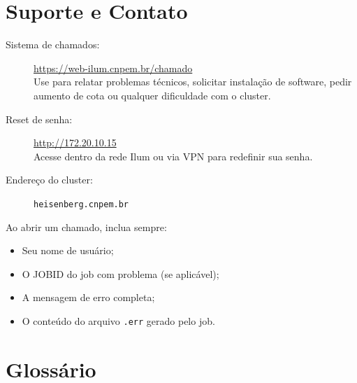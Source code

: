 \documentclass[11pt, a4paper]{article}
\begin{document}
\section{Suporte e Contato}

\begin{tcolorbox}[colback=infoblue, colframe=infoborder,
                  title={Onde buscar ajuda}, fonttitle=\bfseries]
\begin{description}
  \item[Sistema de chamados:] \url{https://web-ilum.cnpem.br/chamado}\\
    Use para relatar problemas técnicos, solicitar instalação de software,
    pedir aumento de cota ou qualquer dificuldade com o cluster.
  \item[Reset de senha:] \url{http://172.20.10.15}\\
    Acesse dentro da rede Ilum ou via VPN para redefinir sua senha.
  \item[Endereço do cluster:] \texttt{heisenberg.cnpem.br}
\end{description}
\end{tcolorbox}

\vspace{1em}

Ao abrir um chamado, inclua sempre:
\begin{itemize}
  \item Seu nome de usuário;
  \item O JOBID do job com problema (se aplicável);
  \item A mensagem de erro completa;
  \item O conteúdo do arquivo \texttt{.err} gerado pelo job.
\end{itemize}

\appendix

\section{Glossário}
\end{document}
